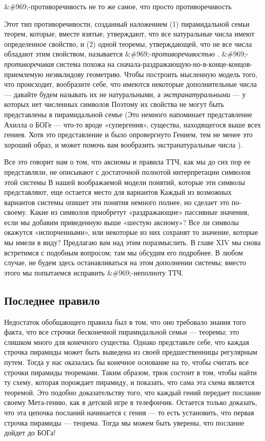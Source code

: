 \documentclass[../main.tex]{subfiles}
\begin{document}
\&\#969;-противоречивость не то же самое, что просто противоречивость

Этот тип противоречивости, созданный наложением (1) пирамидальной семьи теорем, которые, вместе взятые, утверждают, что все натуральные числа имеют определенное свойство, и (2) одной теоремы, утверждающей, что не все числа обладают этим свойством, называется \&\#969;-\emph{противоречивостью} . \&\#969;-\emph{противоречивая} система похожа на сначала-раздражающую-но-в-конце-концов-приемлемую неэвклидову геометрию. Чтобы построить мысленную модель того, что происходит, вообразите себе, что имеются некоторые дополнительные числа --- давайте будем называть их не натуральными, а \emph{экстранатуральными} --- у которых нет численных символов Поэтому их свойства не могут быть представлены в пирамидальной семье (Это немного напоминает представление Ахилла о БОГе --- что-то вроде «супергения», существа, находящегося выше всех гениев. Хотя это представление и было опровергнуто Гением, тем не менее это хороший образ, и может помочь вам вообразить экстранатуральные числа ).

Все это говорит нам о том, что аксиомы и правила ТТЧ, как мы до сих пор ее представляли, не описывают с достаточной полнотой интерпретации символов этой системы В нашей воображаемой модели понятий, которые эти символы представляют, еще остается место для вариантов Каждый из возможных вариантов системы опишет эти понятия немного полнее, но сделает это по-своему. Какие из символов приобретут «раздражающие» пассивные значения, если мы добавим приведенную выше «шестую аксиому»? Все ли символы окажутся «испорченными», или некоторые из них сохранят то значение, которые мы имели в виду? Предлагаю вам над этим поразмыслить. В главе XIV мы снова встретимся с подобным вопросом; там мы обсудим его подробнее. В любом случае, не будем здесь останавливаться на этом дополнении системы; вместо этого мы попытаемся исправить \&\#969;-неполноту ТТЧ.


\subsection{Последнее правило}

Недостаток обобщающего правила был в том, что оно требовало знания того факта, что все строчки бесконечной пирамидальной семьи --- теоремы; это слишком много для конечного существа. Однако представьте себе, что каждая строчка пирамиды может быть выведена из своей предшественницы регулярным путем. Тогда у нас оказалась бы конечное основание на то, чтобы считать все строчки пирамиды теоремами. Таким образом, трюк состоит в том, чтобы найти ту схему, которая порождает пирамиду, и показать, что сама эта схема является теоремой. Это подобно доказательству того, что каждый гений передает послание своему Мета-гению, как в детской игре в телефончик. Остается только доказать, что эта цепочка посланий начинается с гения --- то есть установить, что первая строчка пирамиды --- теорема. Тогда мы можем быть уверены, что послание дойдет до БОГа!
\end{document}
